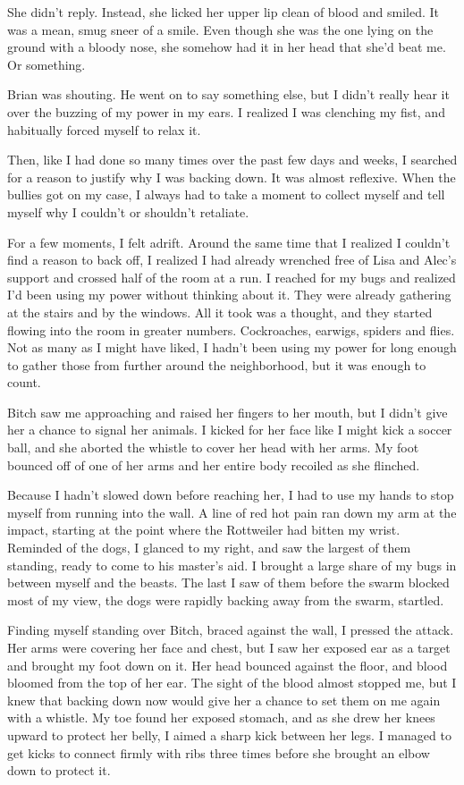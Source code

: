 She didn't reply. Instead, she licked her upper lip clean of blood and smiled. It was a mean, smug sneer of a smile. Even though she was the one lying on the ground with a bloody nose, she somehow had it in her head that she'd beat me. Or something.

 Brian was shouting. He went on to say something else, but I didn't really hear it over the buzzing of my power in my ears. I realized I was clenching my fist, and habitually forced myself to relax it.

Then, like I had done so many times over the past few days and weeks, I searched for a reason to justify why I was backing down. It was almost reflexive. When the bullies got on my case, I always had to take a moment to collect myself and tell myself why I couldn't or shouldn't retaliate.

For a few moments, I felt adrift. Around the same time that I realized I couldn't find a reason to back off, I realized I had already wrenched free of Lisa and Alec's support and crossed half of the room at a run. I reached for my bugs and realized I'd been using my power without thinking about it. They were already gathering at the stairs and by the windows. All it took was a thought, and they started flowing into the room in greater numbers. Cockroaches, earwigs, spiders and flies. Not as many as I might have liked, I hadn't been using my power for long enough to gather those from further around the neighborhood, but it was enough to count.

Bitch saw me approaching and raised her fingers to her mouth, but I didn't give her a chance to signal her animals. I kicked for her face like I might kick a soccer ball, and she aborted the whistle to cover her head with her arms. My foot bounced off of one of her arms and her entire body recoiled as she flinched.

Because I hadn't slowed down before reaching her, I had to use my hands to stop myself from running into the wall. A line of red hot pain ran down my arm at the impact, starting at the point where the Rottweiler had bitten my wrist. Reminded of the dogs, I glanced to my right, and saw the largest of them standing, ready to come to his master's aid. I brought a large share of my bugs in between myself and the beasts. The last I saw of them before the swarm blocked most of my view, the dogs were rapidly backing away from the swarm, startled.

Finding myself standing over Bitch, braced against the wall, I pressed the attack. Her arms were covering her face and chest, but I saw her exposed ear as a target and brought my foot down on it. Her head bounced against the floor, and blood bloomed from the top of her ear. The sight of the blood almost stopped me, but I knew that backing down now would give her a chance to set them on me again with a whistle. My toe found her exposed stomach, and as she drew her knees upward to protect her belly, I aimed a sharp kick between her legs. I managed to get kicks to connect firmly with ribs three times before she brought an elbow down to protect it.

